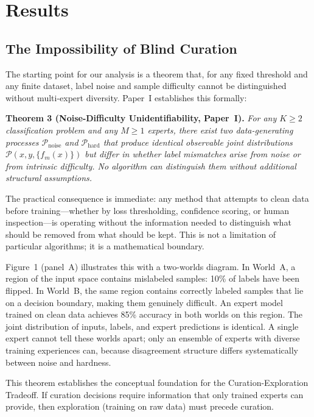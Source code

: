 \section{Results}

\subsection{The Impossibility of Blind Curation}

The starting point for our analysis is a theorem that, for any fixed threshold and any finite dataset, label noise and sample difficulty cannot be distinguished without multi-expert diversity. Paper~I establishes this formally:

\noindent\textbf{Theorem 3 (Noise-Difficulty Unidentifiability, Paper~I).} \emph{For any $K \geq 2$ classification problem and any $M \geq 1$ experts, there exist two data-generating processes $\mathcal{P}_{\text{noise}}$ and $\mathcal{P}_{\text{hard}}$ that produce identical observable joint distributions $\mathcal{P}(x, y, \{f_m(x)\})$ but differ in whether label mismatches arise from noise or from intrinsic difficulty. No algorithm can distinguish them without additional structural assumptions.}

The practical consequence is immediate: any method that attempts to clean data before training---whether by loss thresholding, confidence scoring, or human inspection---is operating without the information needed to distinguish what should be removed from what should be kept. This is not a limitation of particular algorithms; it is a mathematical boundary.

Figure~1 (panel~A) illustrates this with a two-worlds diagram. In World~A, a region of the input space contains mislabeled samples: 10\% of labels have been flipped. In World~B, the same region contains correctly labeled samples that lie on a decision boundary, making them genuinely difficult. An expert model trained on clean data achieves 85\% accuracy in both worlds on this region. The joint distribution of inputs, labels, and expert predictions is identical. A single expert cannot tell these worlds apart; only an ensemble of experts with diverse training experiences can, because disagreement structure differs systematically between noise and hardness.

This theorem establishes the conceptual foundation for the Curation-Exploration Tradeoff. If curation decisions require information that only trained experts can provide, then exploration (training on raw data) must precede curation.


